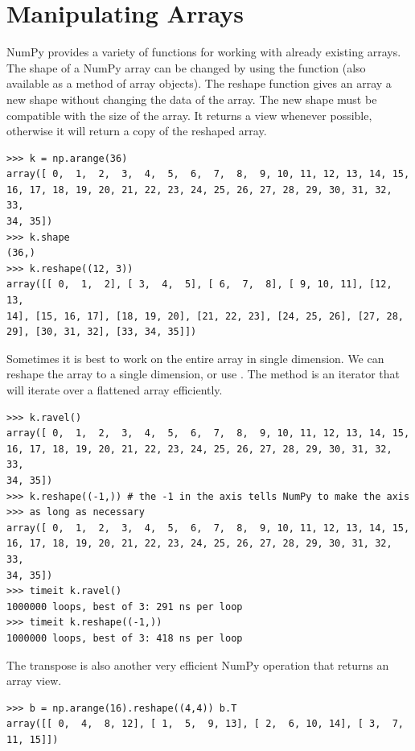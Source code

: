 \section*{Manipulating Arrays} NumPy provides a variety of functions for
working with already existing arrays. The shape of a NumPy array can be
changed by using the  function (also available as a
method of array objects). The reshape function gives an array a new
shape without changing the data of the array. The new shape must be
compatible with the size of the array. It returns a view whenever
possible, otherwise it will return a copy of the reshaped array.
\begin{lstlisting}
>>> k = np.arange(36)
array([ 0,  1,  2,  3,  4,  5,  6,  7,  8,  9, 10, 11, 12, 13, 14, 15,
16, 17, 18, 19, 20, 21, 22, 23, 24, 25, 26, 27, 28, 29, 30, 31, 32, 33,
34, 35])
>>> k.shape
(36,)
>>> k.reshape((12, 3))
array([[ 0,  1,  2], [ 3,  4,  5], [ 6,  7,  8], [ 9, 10, 11], [12, 13,
14], [15, 16, 17], [18, 19, 20], [21, 22, 23], [24, 25, 26], [27, 28,
29], [30, 31, 32], [33, 34, 35]]) \end{lstlisting} Sometimes it is best
to work on the entire array in single dimension. We can reshape the
array to a single dimension, or use . The  method
is an iterator that will iterate over a flattened array efficiently.
\begin{lstlisting}
>>> k.ravel()
array([ 0,  1,  2,  3,  4,  5,  6,  7,  8,  9, 10, 11, 12, 13, 14, 15,
16, 17, 18, 19, 20, 21, 22, 23, 24, 25, 26, 27, 28, 29, 30, 31, 32, 33,
34, 35])
>>> k.reshape((-1,)) # the -1 in the axis tells NumPy to make the axis
>>> as long as necessary
array([ 0,  1,  2,  3,  4,  5,  6,  7,  8,  9, 10, 11, 12, 13, 14, 15,
16, 17, 18, 19, 20, 21, 22, 23, 24, 25, 26, 27, 28, 29, 30, 31, 32, 33,
34, 35])
>>> timeit k.ravel()
1000000 loops, best of 3: 291 ns per loop
>>> timeit k.reshape((-1,))
1000000 loops, best of 3: 418 ns per loop \end{lstlisting} The transpose
is also another very efficient NumPy operation that returns an array
view. \begin{lstlisting}
>>> b = np.arange(16).reshape((4,4)) b.T
array([[ 0,  4,  8, 12], [ 1,  5,  9, 13], [ 2,  6, 10, 14], [ 3,  7,
11, 15]]) \end{lstlisting}


